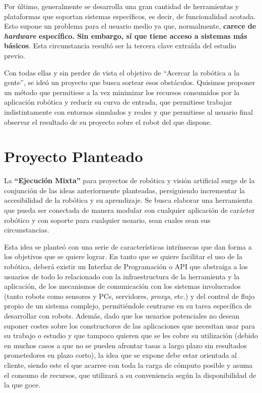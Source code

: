 Por último, generalmente se desarrolla una gran cantidad de herramientas y plataformas que soportan sistemas específicos, es decir, de funcionalidad acotada. Esto supone un problema para el usuario medio ya que, normalmente, \textbf{carece de \textit{hardware} específico. Sin embargo, sí que tiene acceso a sistemas más básicos}. Esta circunstancia resultó ser la tercera clave extraída del estudio previo.

Con todas ellas y sin perder de vista el objetivo de ``Acercar la robótica a la gente'', se ideó un proyecto que busca sortear esos obstáculos. Quisimos proponer un método que permitiese a la vez minimizar los recursos consumidos por la aplicación robótica y reducir su curva de entrada, que permitiese trabajar indistintamente con entornos simulados y reales y que permitiese al usuario final observar el resultado de su proyecto sobre el robot del que dispone.

\section{Proyecto Planteado}

La \textbf{``Ejecución Mixta''} para proyectos de robótica y visión artificial surge de la conjunción de las ideas anteriormente planteadas, persiguiendo incrementar la accesibilidad de la robótica y su aprendizaje. Se busca elaborar una herramienta que pueda ser conectada de manera modular con cualquier aplicación de carácter robótico y con soporte para cualquier usuario, sean cuales sean sus circunstancias.

Esta idea se planteó con una serie de características intrínsecas que dan forma a los objetivos que se quiere lograr. En tanto que se quiere facilitar el uso de la robótica, deberá existir un Interfaz de Programación o API que abstraiga a los usuarios de todo lo relacionado con la infraestructura de la herramienta y la aplicación, de los mecanismos de comunicación con los sistemas involucrados (tanto robots como sensores y PCs, servidores, \textit{proxys}, etc.) y del control de flujo propio de un sistema complejo, permitiéndole centrarse en su tarea específica de desarrollar con robots. Además, dado que los usuarios potenciales no desean suponer costes sobre los constructores de las aplicaciones que necesitan usar para su trabajo o estudio y que tampoco quieren que se les cobre su utilización (debido en muchos casos a que no se pueden afrontar tasas a largo plazo sin resultados prometedores en plazo corto), la idea que se expone debe estar orientada al cliente, siendo este el que acarree con toda la carga de cómputo posible y asuma el consumo de recursos, que utilizará a su conveniencia según la disponibilidad de la que goce.

